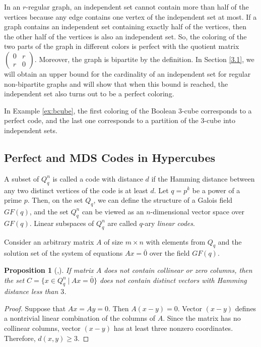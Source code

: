 \documentclass[11pt]{article}
\newtheorem{claim}{Proposition}[section]
\theoremstyle{definition}
\begin{document}
In an $r$-regular graph, an independent set cannot contain more than half of the vertices because any edge contains one vertex of the independent set at most. If a graph
 contains an independent set containing exactly half of the vertices, then the other half
of the vertices is also an independent set. So, the coloring of the two
parts of the graph in different colors is perfect with the quotient matrix
 $\begin{pmatrix}
0 & r \\
r & 0
\end{pmatrix}$. Moreover, the graph is bipartite by the definition.  In Section \ref{3.1}, we will obtain an upper bound for the cardinality
of an independent set for regular non-bipartite graphs and will show that when this bound is reached, the independent set also turns out to be a perfect coloring.

In Example \ref{ex:bcube}, the first coloring of the Boolean $3$-cube
corresponds to a perfect code, and the last one corresponds to a partition
of the $3$-cube into independent sets.



\subsection{Perfect and MDS Codes in Hypercubes}\label{s:MDS}

A subset of $Q^n_q$ is called a code with distance $d$ if
the Hamming distance between any two distinct vertices of the code is at least $d$. Let $q=p^k$ be a power of a prime $p$. Then, on
the set $Q_q$, we can define the structure of a Galois field $GF(q)$, and
the set $Q^n_q$ can be viewed as an $n$-dimensional vector
space over $GF(q)$. Linear subspaces of $Q^n_q$
are called $q$-ary {\sl linear codes}. 

Consider an arbitrary matrix $A$ of size $m\times n$ with elements
from $Q_q$ and the solution set of the system of equations $Ax=\bar{0}$ over
the field $GF(q)$.

\begin{claim}[\cite{Hamming50},\cite{Hamming}]\label{st_dop01}
If matrix $A$ does not contain collinear or zero columns, then
the set $C=\{x\in Q^n_q \ |\ Ax=\bar{0}\}$ does not contain distinct
vectors with Hamming distance less than $3$.
\end{claim}
\begin{proof}
Suppose that $Ax=Ay=0$. Then $A(x-y)=0$. Vector $(x-y)$ defines a nontrivial linear
combination  of the columns of $A$. Since the matrix has no
collinear columns, vector $(x-y)$ has at least three
nonzero coordinates. Therefore, $d(x,y)\geq 3$.
\end{proof}
\end{document}
